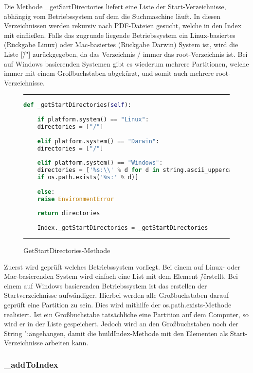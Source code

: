 Die Methode \_getSartDirectories liefert eine Liste der Start-Verzeichnisse, abhängig vom Betriebssystem auf dem die Suchmaschine läuft. In diesen Verzeichnissen werden rekursiv nach PDF-Dateien gesucht, welche in den Index mit einfließen. Falls das zugrunde liegende Betriebssystem ein Linux-basiertes (Rückgabe Linux) oder Mac-basiertes (Rückgabe Darwin) System ist, wird die Liste [\"/"] zurückgegeben, da das Verzeichnis / immer das root-Verzeichnis ist. Bei auf Windows basierenden Systemen gibt es wiederum mehrere Partitionen, welche immer mit einem Großbuchstaben abgekürzt, und somit auch mehrere root-Verzeichnisse.

\begin{figure}[h]
	\rule{\textwidth}{0.4pt}
	\begin{lstlisting}[language=Python]
	def _getStartDirectories(self):
	
	if platform.system() == "Linux":
	directories = ["/"]
	
	elif platform.system() == "Darwin":
	directories = ["/"]
	
	elif platform.system() == "Windows":
	directories = ['%s:\\' % d for d in string.ascii_uppercase
	if os.path.exists('%s:' % d)]
	
	else:
	raise EnvironmentError
	
	return directories
	
	Index._getStartDirectories = _getStartDirectories
	\end{lstlisting}
	\rule{\textwidth}{0.4pt}
	\caption{GetStartDirectories-Methode}
	\label{fig:start}
\end{figure}

Zuerst wird geprüft welches Betriebssystem vorliegt. Bei einem auf Linux- oder Mac-basierenden System wird einfach eine List mit dem Element \"/\" erstellt. Bei einem auf Windows basierenden Betriebssystem ist das erstellen der Startverzeichnisse aufwändiger. Hierbei werden alle Großbuchstaben darauf geprüft eine Partition zu sein. Dies wird mithilfe der os.path.exists-Methode realisiert. Ist ein Großbuchstabe tatsächliche eine Partition auf dem Computer, so wird er in der Liste gespeichert. Jedoch wird an den Großbuchstaben noch der String ":\" angehangen, damit die buildIndex-Methode mit den Elementen als Start-Verzeichnisse arbeiten kann.

\subsubsection{\_addToIndex}\label{addtoindex}

